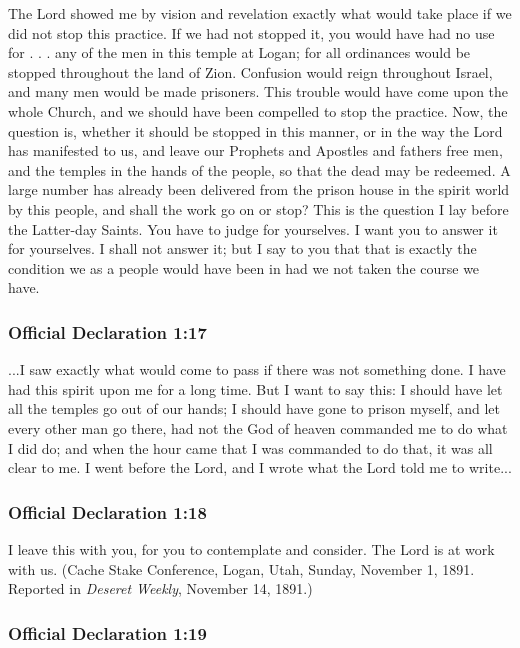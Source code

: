 		The Lord showed me by vision and revelation exactly what would take place if we did not stop this practice.  If we had not stopped it, you would have had no use for . . . any of the men in this temple at Logan; for all ordinances would be stopped throughout the land of Zion.  Confusion would reign throughout Israel, and many men would be made prisoners.  This trouble would have come upon the whole Church, and we should have been compelled to stop the practice.  Now, the question is, whether it should be stopped in this manner, or in the way the Lord has manifested to us, and leave our Prophets and Apostles and fathers free men, and the temples in the hands of the people, so that the dead may be redeemed.  A large number has already been delivered from the prison house in the spirit world by this people, and shall the work go on or stop?  This is the question I lay before the Latter-day Saints.  You have to judge for yourselves.  I want you to answer it for yourselves.  I shall not answer it; but I say to you that that is exactly the condition we as a people would have been in had we not taken the course we have.
		
	\subsubsection{Official Declaration 1:17} %
		\label{OD1-17}
		
		...I saw exactly what would come to pass if there was not something done.  I have had this spirit upon me for a long time.  But I want to say this: I should have let all the temples go out of our hands; I should have gone to prison myself, and let every other man go there, had not the God of heaven commanded me to do what I did do; and when the hour came that I was commanded to do that, it was all clear to me.  I went before the Lord, and I wrote what the Lord told me to write...
		
	\subsubsection{Official Declaration 1:18} %
		\label{OD1-18}
		
		I leave this with you, for you to contemplate and consider.  The Lord is at work with us.  (Cache Stake Conference, Logan, Utah, Sunday, November 1, 1891.  Reported in \textit{Deseret Weekly}, November 14, 1891.)
		
	\subsubsection{Official Declaration 1:19} %
		\label{OD1-19}
		
